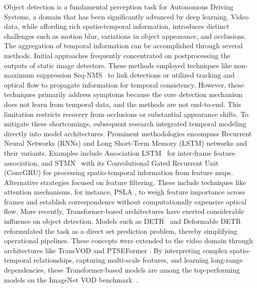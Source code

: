 Object detection is a fundamental perception task for Autonomous Driving Systems, a domain that has been significantly advanced by deep learning. Video data, while affording rich spatio-temporal information, introduces distinct challenges such as motion blur, variations in object appearance, and occlusions. The aggregation of temporal information can be accomplished through several methods. Initial approaches frequently concentrated on postprocessing the outputs of static image detectors. These methods employed techniques like non-maximum suppression Seq-NMS~\cite{hanSeqNMSVideoObject2016} to link detections or utilized tracking and optical flow \cite{kangObjectDetectionVideo2016, kangTCNNTubeletsConvolutional2018} to propagate information for temporal consistency. However, these techniques primarily address symptoms because the core detection mechanism does not learn from temporal data, and the methods are not end-to-end. This limitation restricts recovery from occlusions or substantial appearance shifts. To mitigate these shortcomings, subsequent research integrated temporal modeling directly into model architectures. Prominent methodologies encompass Recurrent Neural Networks (RNNs) and Long Short-Term Memory (LSTM) networks and their variants. Examples include Association LSTM~\cite{Lu_2017_ICCV} for inter-frame feature association, and STMN~\cite{xiaoVideoObjectDetection2018} with its Convolutional Gated Recurrent Unit (ConvGRU) for processing spatio-temporal information from feature maps. Alternative strategies focused on feature filtering. These include techniques like attention mechanisms, for instance, PSLA \cite{guoProgressiveSparseLocal2019}, to weigh feature importance across frames and establish correspondence without computationally expensive optical flow. More recently, Transformer-based architectures \cite{vaswaniAttentionAllYou2023} have exerted considerable influence on object detection. Models such as DETR~\cite{carionEndtoEndObjectDetection2020} and Deformable DETR~\cite{zhuDeformableDETRDeformable2021} reformulated the task as a direct set prediction problem, thereby simplifying operational pipelines. These concepts were extended to the video domain through architectures like TransVOD \cite{zhouTransVODEndtoEndVideo2023} and PTSEFormer \cite{wangPTSEFormerProgressiveTemporalSpatial2022}. By interpreting complex spatio-temporal relationships, capturing multi-scale features, and learning long-range dependencies, these Transformer-based models are among the top-performing models on the ImageNet VOD benchmark~\cite{russakovskyImageNetLargeScale2015}.

